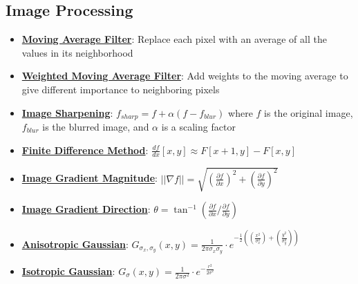 \documentclass{article}%
\begin{document}
%
\subsection{Image Processing}%
\label{subsec:ImageProcessing}%
\begin{itemize}[leftmargin=*]%
\item \href{https://www.math.purdue.edu/~yipn/351/07L2-Vision.pdf#page=38}{\textbf{Moving Average Filter}}: Replace each pixel with an average of all the values in its neighborhood%
\item \href{https://www.math.purdue.edu/~yipn/351/07L2-Vision.pdf#page=40}{\textbf{Weighted Moving Average Filter}}: Add weights to the moving average to give different importance to neighboring pixels%
\item \href{https://www.math.purdue.edu/~yipn/351/07L2-Vision.pdf#page=55}{\textbf{Image Sharpening}}: $f_{sharp} = f + \alpha(f - f_{blur})$ where $f$ is the original image, $f_{blur}$ is the blurred image, and $\alpha$ is a scaling factor%
\item \href{https://www.math.purdue.edu/~yipn/351/08L2-Feature Extraction.pdf#page=15}{\textbf{Finite Difference Method}}: $\frac{df}{dx} [x, y] \approx F[x + 1, y] - F[x, y]$%
\item \href{https://www.math.purdue.edu/~yipn/351/08L2-Feature Extraction.pdf#page=17}{\textbf{Image Gradient Magnitude}}: $||\nabla f|| = \sqrt{(\frac{\partial f}{\partial x})^2 + (\frac{\partial f}{\partial y})^2}$%
\item \href{https://www.math.purdue.edu/~yipn/351/08L2-Feature Extraction.pdf#page=34}{\textbf{Image Gradient Direction}}: $\theta = \tan^{-1}(\frac{\partial f}{\partial x} / \frac{\partial f}{\partial y})$%
\item \href{https://www.math.purdue.edu/~yipn/351/08L2-Feature Extraction.pdf#page=43}{\textbf{Anisotropic Gaussian}}: $G_{\sigma_x, \sigma_y}(x, y) = \frac{1}{2\pi\sigma_x\sigma_y} \cdot e^{-\frac{1}{2}((\frac{x^2}{\sigma_x^2}) + (\frac{y^2}{\sigma_y^2}))}$%
\item \href{https://www.math.purdue.edu/~yipn/351/08L2-Feature Extraction.pdf#page=43}{\textbf{Isotropic Gaussian}}: $G_\sigma(x, y) = \frac{1}{2\pi\sigma^2} \cdot e^{-\frac{r^2}{2\sigma^2}}$%
\end{itemize}

%
\end{document}
